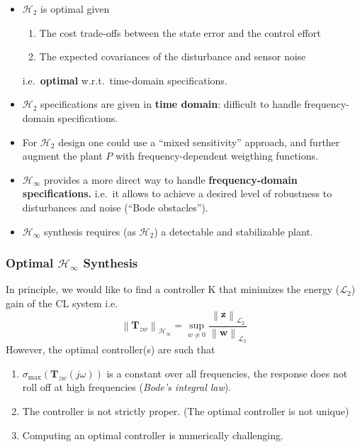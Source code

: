 \begin{itemize}
    \item $\mathcal{H}_2$ is optimal given
          \begin{enumerate}
              \item The cost trade-offs between the state error and the control effort
              \item The expected covariances of the disturbance and sensor noise
          \end{enumerate} i.e.\ \textbf{optimal} w.r.t.\ time-domain specifications.
    \item $\mathcal{H}_2$ specifications are given in \textbf{time domain}: difficult to handle frequency-domain specifications.
    \item For $\mathcal{H}_2$ design one could use a ``mixed sensitivity'' approach, and further augment the plant $P$ with frequency-dependent weigthing functions.
    \item $\mathcal{H}_\infty$ provides a more direct way to handle \textbf{frequency-domain specifications.} i.e.\ it allows to achieve a desired level of robustness to disturbances and noise (``Bode obstacles'').
\end{itemize}

\newpar{}
\begin{itemize}
    \item $\mathcal{H}_\infty$ synthesis requires (as $\mathcal{H}_2$) a detectable and stabilizable plant.
\end{itemize}

\subsubsection{Optimal \texorpdfstring{$\mathcal{H}_\infty$}{H-infinity} Synthesis}
In principle, we would like to find a controller K that minimizes the energy ($\mathcal{L}_2$) gain of the CL system i.e.
\begin{equation*}
    \left\|\mathbf{T}_{zw}\right\|_{\mathcal{H}_\infty}=\sup_{w\neq0}\frac{\left\|\mathbf{z}\right\|_{\mathcal{L}_2}}{\left\|\mathbf{w}\right\|_{\mathcal{L}_2}}
\end{equation*}
However, the optimal controller(s) are such that
\begin{enumerate}
    \item $\sigma_{\max}(\mathbf{T}_{zw}(j\omega))$ is a constant over all frequencies, the response does not roll off at high frequencies (\textit{Bode's integral law}).
    \item The controller is not strictly proper. (The optimal controller is not unique)
    \item Computing an optimal controller is numerically challenging.
\end{enumerate}

